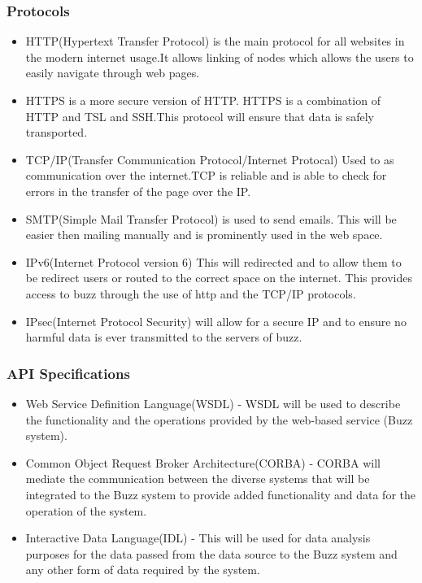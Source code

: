 \subsubsection{Protocols}
\begin{itemize}
\item HTTP(Hypertext Transfer Protocol) is the main protocol for all websites in the modern internet usage.It allows linking of nodes which allows the users to easily navigate through web pages.
\item HTTPS is a more secure version of HTTP. HTTPS is a combination of HTTP and TSL and SSH.This protocol will ensure that data is safely transported.
\item TCP/IP(Transfer Communication Protocol/Internet Protocal) Used to as communication over the internet.TCP is reliable and is able to check for errors in the transfer of the page over the IP.
\item SMTP(Simple Mail Transfer Protocol) is used to send emails. This will be easier then mailing manually and is prominently used in the web space.
\item IPv6(Internet Protocol version 6) This will  redirected and to allow them to be redirect users or routed to the correct space on the internet. This provides access to buzz through the use of http and the TCP/IP protocols.
\item IPsec(Internet Protocol Security) will allow for a secure IP and to ensure no harmful data is ever transmitted to the servers of buzz.
\end{itemize}

\subsubsection{API Specifications}
\begin{itemize}
\item Web Service Definition Language(WSDL) - WSDL will be used to describe the functionality and the operations provided by the web-based service (Buzz system).
\item Common Object Request Broker Architecture(CORBA) - CORBA will mediate the communication between the diverse systems that will be integrated to the Buzz system to provide added functionality and data for the operation of the system.
\item Interactive Data Language(IDL) - This will be used for data analysis purposes for the data passed from the data source to the Buzz system and any other form of data required by the system.
\end{itemize}
